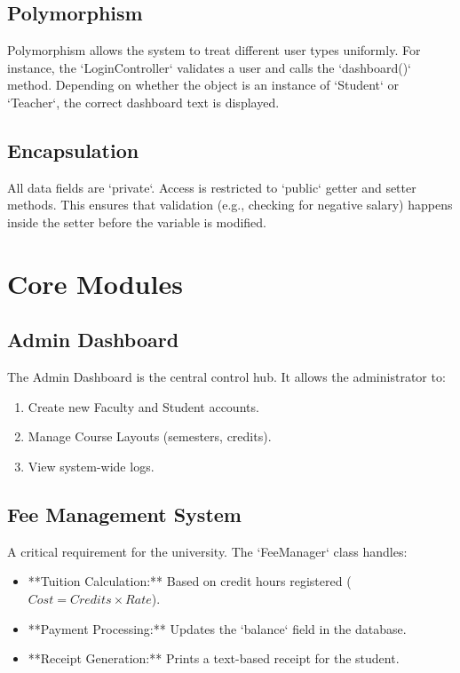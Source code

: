 \documentclass[12pt, a4paper]{report}
\begin{document}
\subsection{Polymorphism}
Polymorphism allows the system to treat different user types uniformly. For instance, the `LoginController` validates a user and calls the `dashboard()` method. Depending on whether the object is an instance of `Student` or `Teacher`, the correct dashboard text is displayed.

\subsection{Encapsulation}
All data fields are `private`. Access is restricted to `public` getter and setter methods. This ensures that validation (e.g., checking for negative salary) happens inside the setter before the variable is modified.

\section{Core Modules}

\subsection{Admin Dashboard}
The Admin Dashboard is the central control hub. It allows the administrator to:
\begin{enumerate}
    \item Create new Faculty and Student accounts.
    \item Manage Course Layouts (semesters, credits).
    \item View system-wide logs.
\end{enumerate}

\subsection{Fee Management System}
A critical requirement for the university. The `FeeManager` class handles:
\begin{itemize}
    \item **Tuition Calculation:** Based on credit hours registered ($Cost = Credits \times Rate$).
    \item **Payment Processing:** Updates the `balance` field in the database.
    \item **Receipt Generation:** Prints a text-based receipt for the student.
\end{itemize}
\end{document}
